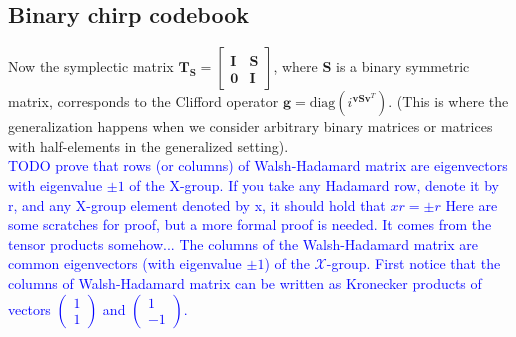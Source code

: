 \documentclass{article}
\begin{document}
	
	\subsection*{Binary chirp codebook}
	Now the symplectic matrix $\mathbf{T}_\mathbf{S} = \begin{bmatrix} \mathbf{I} & \mathbf{S} \\ \mathbf{0} & \mathbf{I} \end{bmatrix}$, where $\mathbf{S}$ is a binary symmetric matrix, corresponds to the Clifford operator $\mathbf{g} = \text{diag}(i^{\mathbf{v}\mathbf{S}\mathbf{v}^T})$. (This is where the generalization happens when we consider arbitrary binary matrices or matrices with half-elements in the generalized setting). \\
	
	\textcolor{blue}{
		TODO prove that rows (or columns) of Walsh-Hadamard matrix are eigenvectors with eigenvalue $\pm 1$ of the X-group. If you take any Hadamard row, denote it by r, and any X-group element denoted by x, 
		it should hold that $xr = \pm r$ 
	}
	\textcolor{blue}{
		Here are some scratches for proof, but a more formal proof is needed. It comes from the tensor products somehow...
	}
	\textcolor{blue}{	
		The columns of the Walsh-Hadamard matrix are common eigenvectors (with eigenvalue $\pm 1$) of the $\mathcal{X}$-group. First notice that the columns of Walsh-Hadamard matrix can be written as Kronecker products of vectors $\begin{pmatrix} 1 \\ 1 \end{pmatrix}$ and $\begin{pmatrix} 1 \\ -1 \end{pmatrix}$.
	}
	
\end{document}
